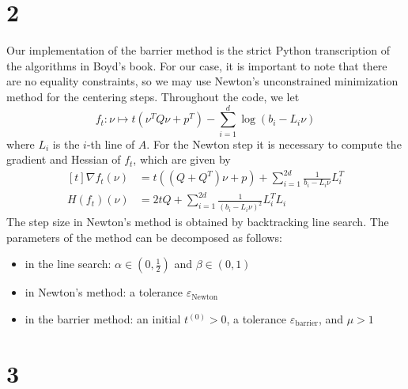 \documentclass[a4paper,11pt]{article}
\begin{document}
\section*{2}
Our implementation of the barrier method is the strict Python transcription of the algorithms in Boyd's book. For our case, it is important to note that there are no equality constraints, so we may use Newton's unconstrained minimization method for the centering steps.\newline
Throughout the code, we let $$f_t:\nu \mapsto t(\nu^TQ\nu  + p^T) - \sum_{i=1}^d \log(b_i-L_i \nu)$$ where $L_i$ is the $i$-th line of $A$. For the Newton step it is necessary to compute the gradient and Hessian of $f_t$, which are given by $$\begin{aligned}[t]\nabla f_t(\nu) &= t((Q+Q^T)\nu + p) + \sum_{i=1}^{2d} \frac{1}{b_i-L_i\nu}L_i^T\\
H(f_t)(\nu) &= 2tQ + \sum_{i=1}^{2d} \frac{1}{(b_i-L_i\nu)^2}L_i^TL_i\end{aligned}$$
The step size in Newton's method is obtained by backtracking line search.
\newline \newline 
\noindent The parameters of the method can be decomposed as follows: 
\begin{itemize}
  \item in the line search: $\alpha\in \left(0,\frac 12 \right)$ and $\beta\in (0,1)$
  \item in Newton's method: a tolerance $\varepsilon_{\text{Newton}}$
  \item in the barrier method: an initial $t^{(0)}>0$, a tolerance $\varepsilon_{\text{barrier}}$, and $\mu> 1$
\end{itemize}

\section*{3}
\end{document}
